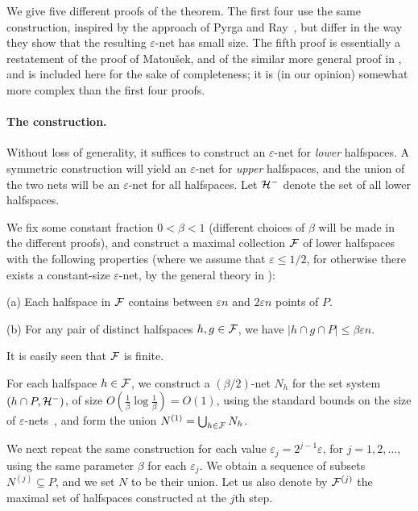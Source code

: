 \documentclass[12pt]{article}
\newcommand{\eps}{{\varepsilon}}
\providecommand{\Matousek}{Matou{\v s}ek\xspace}
\def\F{{\cal F}}
\newcommand{\CalH}{{\cal H}}
\renewcommand{\th}{th\xspace}
\begin{document}
\medskip

We give five different proofs of the theorem. The first four use the
same construction, inspired by the approach of Pyrga and
Ray~\cite{pr-nepen-08}, but differ in the way they show that the resulting
$\eps$-net has small size. The fifth proof is essentially a
restatement of the proof of \Matousek \cite{m-rph-92}, and of the
similar more general proof in \cite{cv-iaags-07}, and is included here
for the sake of completeness; it is (in our opinion) somewhat more
complex than the first four proofs.

\paragraph{The construction.}
Without loss of generality, it suffices to construct an $\eps$-net
for {\em lower} halfspaces. A symmetric construction will yield an
$\eps$-net for {\em upper} halfspaces, and the union of the two nets
will be an $\eps$-net for all halfspaces.
Let $\CalH^-$ denote the set of all lower halfspaces.

We fix some constant fraction $0<\beta<1$ (different choices of
$\beta$ will be made in the different proofs), and construct a
maximal collection $\F$ of lower halfspaces with the following
properties (where we assume that $\eps\le 1/2$, for otherwise
there exists a constant-size $\eps$-net, by the general theory
in \cite{hw-ensrq-87}):

\begin{description}
    \item{(a)} Each halfspace in $\F$ contains between $\eps n$ and
    $2\eps n$ points of $P$.

    \item{(b)} For any pair of distinct halfspaces $h,g\in\F$,
    we have $|h\cap g\cap P| \le \beta\eps n$.
\end{description}

It is easily seen that $\F$ is finite.

For each halfspace $h\in\F$, we construct a $(\beta/2)$-net $N_h$ for
the set system $(h\cap P,\CalH^-)$, of size
$O\left(\frac{1}{\beta}\log\frac{1}{\beta}\right) = O(1)$, using the
standard bounds on the size of $\eps$-nets~\cite{hw-ensrq-87}, and
form the union $N^{(1)}=\bigcup_{h\in\F} N_h$.

We next repeat the same construction for each value
$\eps_j = 2^{j-1}\eps$, for $j=1,2,\ldots$, using the same parameter
$\beta$ for each $\eps_j$. We obtain a sequence of subsets
$N^{(j)}\subseteq P$, and we set $N$ to be their union.
Let us also denote by $\F^{(j)}$ the maximal set of halfspaces
constructed at the $j$\th step.
\end{document}
